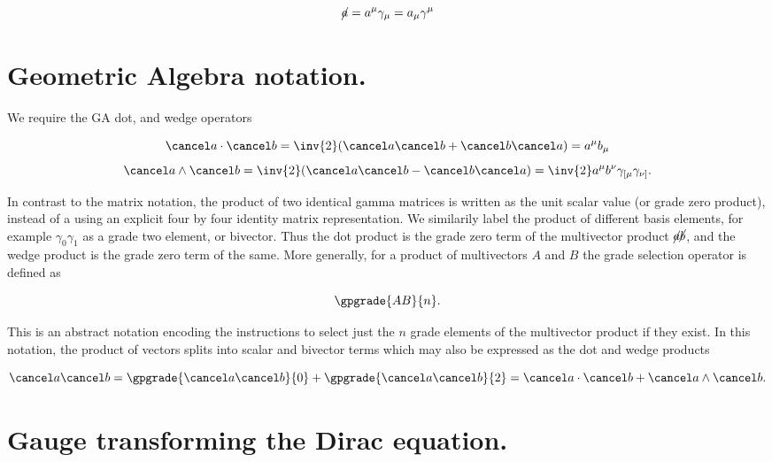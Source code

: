 \begin{equation}\label{eqn:diracCovariant:50}
\cancel{a} = a^\mu \gamma_\mu = a_\mu \gamma^\mu
\end{equation}

\section{Geometric Algebra notation.}

We require the GA dot, and wedge operators

\begin{equation}\label{eqn:diracCovariant:70}
\aslash \cdot \bslash = \inv{2}( \aslash \bslash + \bslash \aslash ) = a^\mu b_\mu
\end{equation}
\begin{equation}\label{eqn:diracCovariant:90}
\aslash \wedge \bslash = \inv{2}( \aslash \bslash - \bslash \aslash ) = \inv{2} a^\mu b^\nu \gamma_{[\mu} \gamma_{\nu]}.
\end{equation}

In contrast to the matrix notation, the product of two identical gamma matrices is written as the unit scalar value (or grade zero product), instead of a using an explicit four by four identity matrix representation.  We similarily label the product of different basis elements, for example $\gamma_0 \gamma_1$ as a grade two element, or bivector.  Thus the dot product is the grade zero term of the multivector product $\cancel{a} \cancel{b}$, and the wedge product is the grade zero term of the same.  More generally, for a product of multivectors $A$ and $B$ the grade selection operator is defined as

\begin{equation}\label{eqn:diracCovariant:110}
\gpgrade{A B}{n}.
\end{equation}

This is an abstract notation encoding the instructions to select just the $n$ grade elements of the multivector product if they exist.  In this notation, the product of vectors splits into scalar and bivector terms which may also be expressed as the dot and wedge products

\begin{equation}\label{eqn:diracCovariant:130}
\aslash \bslash = \gpgrade{\aslash \bslash}{0} + \gpgrade{\aslash \bslash}{2} = \aslash \cdot \bslash + \aslash \wedge \bslash.
\end{equation}

\section{Gauge transforming the Dirac equation.}

